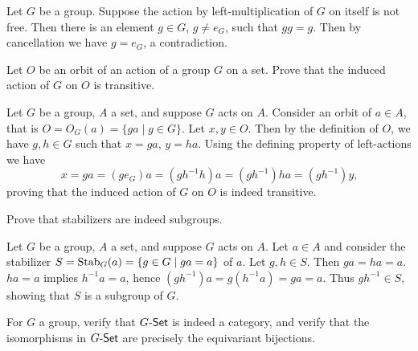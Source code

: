 \begin{solution}
	Let $G$ be a group. Suppose the action by left-multiplication of $G$ on itself is not free. Then there is an element $g \in G$, $g \neq e_G$, such that $g g = g$. Then by cancellation we have $g = e_G$, a contradiction.
\end{solution}

\begin{problem}
	Let $O$ be an orbit of an action of a group $G$ on a set. Prove that the induced action of $G$ on $O$ is transitive.
\end{problem}

\begin{solution}
	Let $G$ be a group, $A$ a set, and suppose $G$ acts on $A$. Consider an orbit of $a \in A$, that is $O = O_G(a) = \{ ga \mid g \in G \}$. Let $x, y \in O$. Then by the definition of $O$, we have $g, h \in G$ such that $x = ga$, $y = ha$. Using the defining property of left-actions we have
	\[
		x = ga = (g e_G) a = (g h^{-1} h) a = (g h^{-1}) ha = (g h^{-1}) y \text{,}
	\]
	proving that the induced action of $G$ on $O$ is indeed transitive.
\end{solution}

\begin{problem}
	Prove that stabilizers are indeed subgroups.
\end{problem}

\begin{solution}
	Let $G$ be a group, $A$ a set, and suppose $G$ acts on $A$. Let $a \in A$ and consider the stabilizer $S = \operatorname{Stab}_G(a) = \{ g \in G \mid ga = a \}$ of $a$. Let $g, h \in S$. Then $ga = ha = a$. $ha = a$ implies $h^{-1}a = a$, hence $(gh^{-1})a = g(h^{-1}a) = ga = a$. Thus $gh^{-1} \in S$, showing that $S$ is a subgroup of $G$.
\end{solution}

\begin{problem}
	For $G$ a group, verify that $G\text{-}\mathsf{Set}$ is indeed a category, and verify that the isomorphisms in $G\text{-}\mathsf{Set}$ are precisely the equivariant bijections.
\end{problem}


